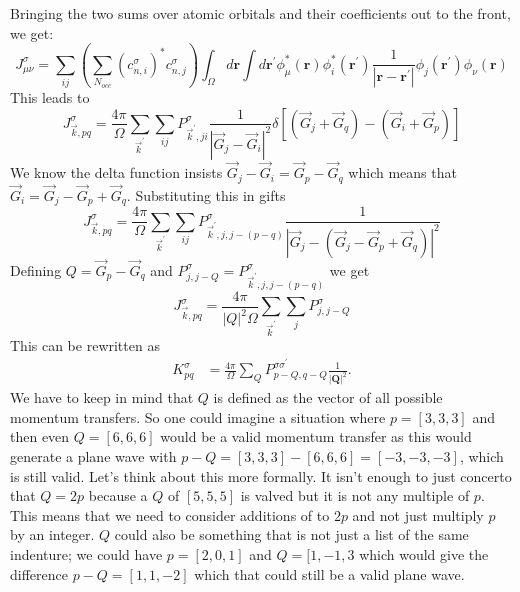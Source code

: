 \documentclass[12pt]{article}
\begin{document}
Bringing the two sums over atomic orbitals and their coefficients out to the front, we get:
\begin{equation}
    J^{\sigma }_{\mu\nu} = \sum_{ij} \left( \sum_{N_{occ}} \left( c^{\sigma }_{n,i} \right)^{*} c^{\sigma }_{n,j} \right) \int_{\Omega } d\mathbf{r} \int d\mathbf{r}^{\prime} \phi^*_\mu(\mathbf{r}) \phi^*_i(\mathbf{r}^{\prime}) \frac{1}{\left|\mathbf{r} - \mathbf{r}^{\prime}\right|} \phi_j(\mathbf{r}^{\prime}) \phi_\nu(\mathbf{r})
\end{equation}
This leads to
\begin{equation}
J_{\vec{k}, p q}^\sigma=\frac{4 \pi}{\Omega} \sum_{\vec{k}^{\prime}} \sum_{i j} P_{\vec{k}^{\prime}, j i}^\sigma \frac{1}{\left|\vec{G}_j-\vec{G}_i\right|^2} \delta\left[\left(\vec{G}_j+\vec{G}_q\right)-\left(\vec{G}_i+\vec{G}_p\right)\right]
\end{equation}
We know the delta function insists $\vec{G}_j-\vec{G}_i = \vec{G}_p - \vec{G}_q$ which means that $\vec{G}_i = \vec{G}_j - \vec{G}_p + \vec{G}_q$. Substituting this in gifts
\begin{equation}
J_{\vec{k}, p q}^\sigma=\frac{4 \pi}{\Omega} \sum_{\vec{k}^{\prime}} \sum_{i j} P_{\vec{k}^{\prime}, j, j - (p-q)}^\sigma \frac{1}{\left|\vec{G}_j-\left( \vec{G}_j - \vec{G}_p + \vec{G}_q \right)\right|^2}
\end{equation}
Defining $Q = \vec{G}_p - \vec{G}_q$ and $P_{j, j-Q}^\sigma = P_{\vec{k}^{\prime}, j, j - (p-q)}^\sigma$ we get
\begin{equation}
J_{\vec{k}, p q}^\sigma=\frac{4 \pi}{|Q|^2\Omega } \sum_{\vec{k}^{\prime}} \sum_{j} P_{j, j-Q}^\sigma
\end{equation}
This can be rewritten as
\begin{equation}
\begin{aligned}
K_{pq}^\sigma & = \frac{4 \pi}{\Omega} \sum_Q P_{p-Q, q-Q}^{\sigma \sigma^{\prime}} \frac{1}{\left|\mathbf{Q}\right|^2} .
\end{aligned}
\end{equation}
We have to keep in mind that $Q$ is defined as the vector of all possible momentum transfers. So one could imagine a situation where $p = [3,3,3]$ and then even $Q = [6,6,6]$ would be a valid momentum transfer as this would generate a plane wave with $p-Q = [3,3,3] - [6,6,6] = [-3,-3,-3]$, which is still valid. Let's think about this more formally. It isn't enough to just concerto that $Q=2p$ because a $Q$ of $[5,5,5]$ is valved but it is not any multiple of $p$. This means that we need to consider additions of to $2p$ and not just multiply $p$ by an integer. $Q$ could also be something that is not just a list of the same indenture; we could have $p = [2,0,1]$ and $Q = [1,-1,3$ which would give the difference $p-Q = [1,1,-2]$ which that could still be a valid plane wave. 
\end{document}
